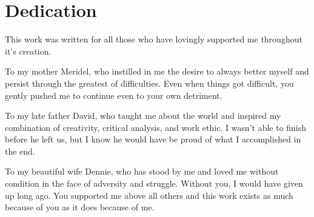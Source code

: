 \onehalfspacing
\chapter*{Dedication}
	This work was written for all those who have lovingly supported me throughout it's creation.

	To my mother Meridel, who instilled in me the desire to always better myself and persist through the greatest of difficulties. Even when things got difficult, you gently pushed me to continue even to your own detriment.

	To my late father David, who taught me about the world and inspired my combination of creativity, critical analysis, and work ethic. I wasn't able to finish before he left us, but I know he would have be proud of what I accomplished in the end.

	To my beautiful wife Dennie, who has stood by me and loved me without condition in the face of adversity and struggle. Without you, I would have given up long ago. You supported me above all others and this work exists as much because of you as it does because of me.